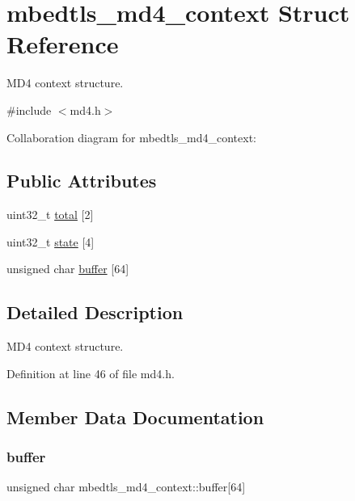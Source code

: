 \hypertarget{structmbedtls__md4__context}{}\section{mbedtls\+\_\+md4\+\_\+context Struct Reference}
\label{structmbedtls__md4__context}


M\+D4 context structure.  




{\ttfamily \#include $<$md4.\+h$>$}



Collaboration diagram for mbedtls\+\_\+md4\+\_\+context\+:
\subsection*{Public Attributes}
\begin{DoxyCompactItemize}
\item 
uint32\+\_\+t \mbox{\hyperlink{structmbedtls__md4__context_afabfb5a783d0033a857a375199bf38cc}{total}} \mbox{[}2\mbox{]}
\item 
uint32\+\_\+t \mbox{\hyperlink{structmbedtls__md4__context_afe9a40acdd5470eebce1b98f9379322e}{state}} \mbox{[}4\mbox{]}
\item 
unsigned char \mbox{\hyperlink{structmbedtls__md4__context_aa345ea12be5988ac3bba40ff49bc7277}{buffer}} \mbox{[}64\mbox{]}
\end{DoxyCompactItemize}


\subsection{Detailed Description}
M\+D4 context structure. 

Definition at line 46 of file md4.\+h.



\subsection{Member Data Documentation}
\mbox{\label{structmbedtls__md4__context_aa345ea12be5988ac3bba40ff49bc7277}} 
\subsubsection{\texorpdfstring{buffer}{buffer}}
{\footnotesize\ttfamily unsigned char mbedtls\+\_\+md4\+\_\+context\+::buffer\mbox{[}64\mbox{]}}

